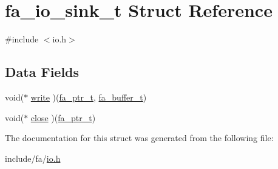 \hypertarget{structfa__io__sink__t}{\section{fa\-\_\-io\-\_\-sink\-\_\-t Struct Reference}
\label{structfa__io__sink__t}
}


{\ttfamily \#include $<$io.\-h$>$}

\subsection*{Data Fields}
\begin{DoxyCompactItemize}
\item 
void($\ast$ \hyperlink{group___fa_gafcdc68dbffd92c15539c7979e63e8f6c}{write} )(\hyperlink{group___fa_ga915ddeae99ad7568b273d2b876425197}{fa\-\_\-ptr\-\_\-t}, \hyperlink{group___fa_buffer_ga0ed7a1d783ab322e2e8be02432d0839e}{fa\-\_\-buffer\-\_\-t})
\item 
void($\ast$ \hyperlink{group___fa_ga9378c8745e9de3a19845186932d871f4}{close} )(\hyperlink{group___fa_ga915ddeae99ad7568b273d2b876425197}{fa\-\_\-ptr\-\_\-t})
\end{DoxyCompactItemize}


The documentation for this struct was generated from the following file\-:\begin{DoxyCompactItemize}
\item 
include/fa/\hyperlink{io_8h}{io.\-h}\end{DoxyCompactItemize}
